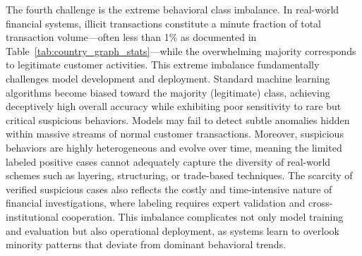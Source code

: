 \documentclass[11pt,english]{article}
\begin{document}
The fourth challenge is the extreme behavioral class imbalance. In real-world financial systems, illicit transactions constitute a minute fraction of total transaction volume—often less than 1\% as documented in Table~\ref{tab:country_graph_stats}—while the overwhelming majority corresponds to legitimate customer activities. This extreme imbalance fundamentally challenges model development and deployment. Standard machine learning algorithms become biased toward the majority (legitimate) class, achieving deceptively high overall accuracy while exhibiting poor sensitivity to rare but critical suspicious behaviors. Models may fail to detect subtle anomalies hidden within massive streams of normal customer transactions. Moreover, suspicious behaviors are highly heterogeneous and evolve over time, meaning the limited labeled positive cases cannot adequately capture the diversity of real-world schemes such as layering, structuring, or trade-based techniques. The scarcity of verified suspicious cases also reflects the costly and time-intensive nature of financial investigations, where labeling requires expert validation and cross-institutional cooperation. This imbalance complicates not only model training and evaluation but also operational deployment, as systems learn to overlook minority patterns that deviate from dominant behavioral trends. 
\end{document}

